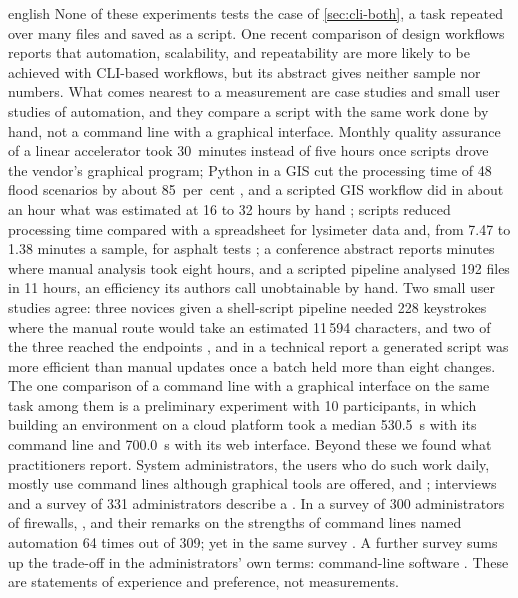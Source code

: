 \begin{onlyin}{english}
None of these experiments tests the case of \cref{sec:cli-both}, a task
repeated over many files and saved as a script.  One recent comparison
of design workflows reports that 
{automation, scalability, and repeatability are more likely to be
achieved with CLI-based workflows}, but its abstract gives neither
sample nor numbers.  What comes nearest to a measurement are case
studies and small user studies of automation, and they compare a script
with the same work done by hand, not a command line with a graphical
interface.  Monthly quality assurance of a linear accelerator took
30~minutes instead of five hours once scripts drove the vendor's graphical
program\autocite{Skinner2019Factor}; Python in a GIS cut the processing
time of 48 flood scenarios by about 85~per~cent
\autocite{Mandal2025Semi}, and a scripted GIS workflow did in about an
hour what was estimated at 16 to 32 hours by hand
\autocite{Pinto2026Semi}; scripts reduced processing time compared with
a spreadsheet for lysimeter data\autocite{Colaizzi2025Algorithms} and,
from 7.47 to 1.38 minutes a sample, for asphalt tests
\autocite{Khakim2026Deterministic}; a conference abstract reports minutes where
manual analysis took eight hours\autocite{Sledziowski2026Expert}, and a
scripted pipeline analysed 192 files in 11 hours, an efficiency its
authors call unobtainable by hand\autocite{Kiseleva2018Proteomic}.  Two small
user
studies agree: three novices given a shell-script pipeline needed 228
keystrokes where the manual route would take an estimated 11\,594
characters, and two of the three reached the endpoints
\autocite{Fung2021QIIME}, and in a technical report a generated script
was more efficient than manual updates once a batch held more than
eight changes\autocite{Tomasic2006Workflow}.  The one comparison of a
command line with a graphical interface on the same task among them is a
preliminary experiment with 10 participants, in which building an
environment on a cloud platform took a median 530.5~s with its command
line and 700.0~s with its web interface\autocite{Shiro2026Block}.
Beyond these we found what practitioners report.  System administrators, the
users who
do such work daily, mostly use command lines although graphical tools
are offered, and ; interviews and a
survey of 331 administrators describe a
.  In a survey of 300 administrators of
firewalls, , and
their remarks on the strengths of command lines named automation 64
times out of 309; yet in the same survey
.
A further survey sums up the trade-off in the administrators' own
terms: command-line software .  These are statements of experience and
preference, not measurements.


\end{onlyin}
